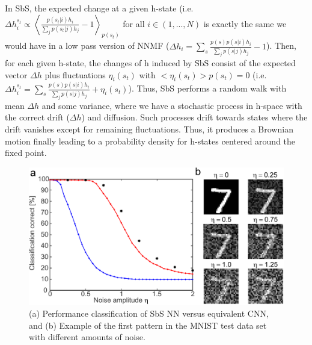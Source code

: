 In SbS, the expected change at a
given h-state (i.e. $\Delta h^{s_t}_i 	\propto \left<
\frac{p(s_t | i) h_i}{\sum_j p(s_t | j) h_j} - 1 \right>_{p(s_t)}$ for all
$i \in (1,...,N)$ is exactly the same we would have in a low pass
version of NNMF ($\Delta h_i
= \sum_s \frac{p(s) p(s | i) h_i}{\sum_j p(s | j) h_j} - 1$). Then,
for each given h-state, the changes of h induced by SbS consist of the
expected vector $\Delta h$ plus fluctuations $\eta_i(s_t)$ with
$<\eta_i(s_t)>p(s_t) = 0$
(i.e. $\Delta h^{s_t}_i = \sum_s \frac{p(s) p(s | i) h_i}{\sum_j p(s | j) h_j} + \eta_i(s_t)$).
Thus, SbS performs a random walk with mean $\Delta h$ and some variance, where we have a stochastic process in h-space with the correct
drift ($\Delta h$) and diffusion. Such processes drift towards states where the drift vanishes except for
remaining fluctuations. Thus, it produces a Brownian motion
finally leading to a probability density for h-states centered around
the fixed point.



\begin{figure}
  \includegraphics[width=\columnwidth]{../figures/sbs_robustnes.pdf}
  \caption{(a) Performance classification of SbS NN versus equivalent CNN, and (b) Example of the first pattern in the MNIST test data set with different amounts of noise.}
  \label{fig:robustnes_sbs}
\end{figure}

